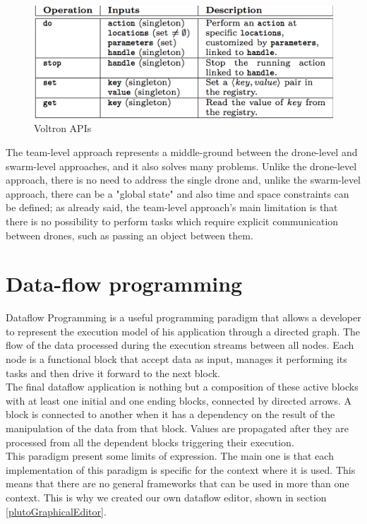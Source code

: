 \begin{figure}[htbp]
  \centering
  \includegraphics[width=\linewidth]{pictures/Voltron.png}
  \caption{Voltron APIs}
  \label{fig:voltron}
\end{figure}


The team-level approach represents a  middle-ground between the drone-level and swarm-level approaches, and it also solves many problems. Unlike the drone-level approach, there is no need to address the single drone and, unlike the swarm-level approach, there can be a "global state" and also time and space constraints can be defined; as already said, the team-level approach's main limitation is that there is no possibility to perform tasks which require explicit communication between drones, such as passing an object between them.
\\

\section{Data-flow programming}\label{dataflow}

Dataflow Programming is a useful programming paradigm that allows a developer to represent the execution model of his application through a directed graph. The flow of the data processed during the execution streams between all nodes. Each node is a functional block that accept data as input, manages it performing its tasks and then drive it forward to the next block. 
\\
The final dataflow application is nothing but a composition of these active blocks with at least one initial and one ending blocks, connected by directed arrows.
A block is connected to another when it has a dependency on the result of the manipulation of the data from that block. Values are propagated after they are processed from all the dependent blocks triggering their execution.
\\

This paradigm present some limits of expression.
The main one is that each implementation of this paradigm is specific for the context where it is used. This means that there are no general frameworks that can be used in more than one context. This is why we created our own dataflow editor, shown in section \ref{plutoGraphicalEditor}.

